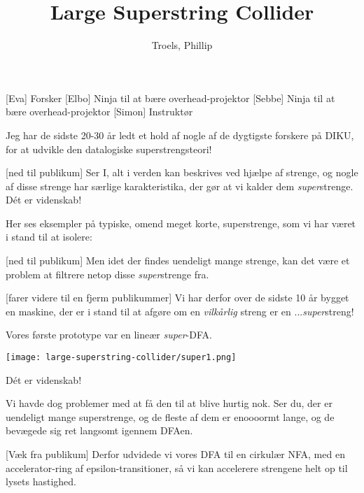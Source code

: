 \documentclass[a4paper,11pt]{article}
\title{Large Superstring Collider}
\author{Troels, Phillip}
\begin{document}
\maketitle
\begin{roles}
  [Eva] Forsker
  [Elbo] Ninja til at bære overhead-projektor
  [Sebbe] Ninja til at bære overhead-projektor
  [Simon] Instruktør
\end{roles}
\begin{props}
\end{props}

\begin{sketch}


 Jeg har de sidste 20-30 år ledt et hold af nogle af de
dygtigste forskere på DIKU, for at udvikle den datalogiske
superstrengsteori!

[ned til publikum] Ser I, alt i verden kan beskrives ved
hjælpe af strenge, og nogle af disse strenge har særlige
karakteristika, der gør at vi kalder dem
\textit{super}strenge.  Dét er videnskab!

 Her ses eksempler på typiske, omend meget korte,
superstrenge, som vi har været i stand til at isolere:


[ned til publikum] Men idet der findes uendeligt mange
strenge,  kan det være et problem at filtrere netop disse
\textit{super}strenge fra.

[farer videre til en fjerm publikummer] Vi har derfor over de
sidste 10 år bygget en maskine,  der er i stand
til at afgøre om en \textit{vilkårlig} streng er en
...\textit{super}streng!

 Vores første prototype var en lineær \textit{super}-DFA.

\texttt{[image: large-superstring-collider/super1.png]}

 Dét er videnskab!

 Vi havde dog problemer med at få den til at blive hurtig
nok.  Ser du, der er uendeligt mange
superstrenge,  og de fleste af dem er enoooormt lange,
 og de bevægede sig ret langsomt igennem DFAen.

[Væk fra publikum] Derfor udvidede vi vores DFA til en
cirkulær NFA, med en accelerator-ring af epsilon-transitioner, så vi
kan accelerere strengene helt op til lysets hastighed.


\end{sketch}
\end{document}
